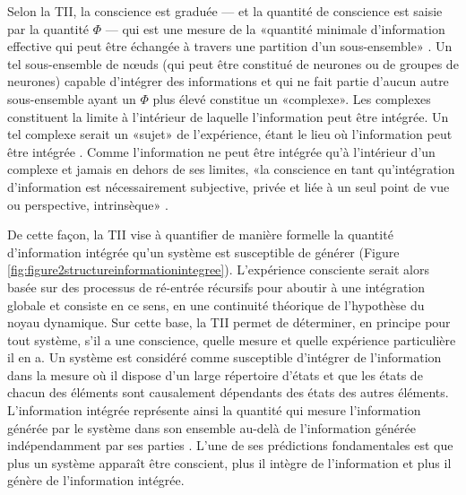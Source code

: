 Selon la TII, la conscience est graduée --- et la quantité de conscience est saisie par la quantité $\Phi$ --- qui est une mesure de la «quantité minimale d'information effective qui peut être échangée à travers une partition d'un sous-ensemble» \citep{tononi2003measuring}. 
Un tel sous-ensemble de nœuds (qui peut être constitué de neurones ou de groupes de neurones) capable d'intégrer des informations et qui ne fait partie d'aucun autre sous-ensemble ayant un $\Phi$ plus élevé constitue un «complexe». 
Les complexes constituent la limite à l'intérieur de laquelle l'information peut être intégrée. 
Un tel complexe serait un «sujet» de l'expérience, étant le lieu où l'information peut être intégrée \citep{tononi2004information}. 
Comme l'information ne peut être intégrée qu'à l'intérieur d'un complexe et jamais en dehors de ses limites, «la conscience en tant qu'intégration d'information est nécessairement subjective, privée et liée à un seul point de vue ou perspective, intrinsèque» \citep{tononi2004information}. 

De cette façon, la TII vise à quantifier de manière formelle la quantité d'information intégrée qu'un système est susceptible de générer (Figure \ref{fig:figure2structureinformationintegree}). 
L'expérience consciente serait alors basée sur des processus de ré-entrée récursifs pour aboutir à une intégration globale et consiste en ce sens, en une continuité théorique de l'hypothèse du noyau dynamique. 
Sur cette base, la TII permet de déterminer, en principe pour tout système, s'il a une conscience, quelle mesure et quelle expérience particulière il en a. 
Un système est considéré comme susceptible d'intégrer de l'information dans la mesure où il dispose d'un large répertoire d'états et que les états de chacun des éléments sont causalement dépendants des états des autres éléments. 
L'information intégrée représente ainsi la quantité qui mesure l'information générée par le système dans son ensemble au-delà de l'information générée indépendamment par ses parties \citep{balduzzi2008integrated, tononi2008consciousness}. 
L'une de ses prédictions fondamentales est que plus un système apparaît être conscient, plus il intègre de l'information et plus il génère de l'information intégrée. 

